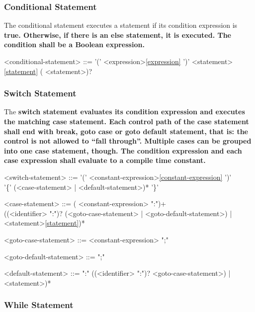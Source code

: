 \documentclass[a4paper,oneside,11pt]{article}
\begin{document}
\subsubsection{Conditional Statement}

The conditional statement executes a statement if its condition expression is \bf{true}.
Otherwise, if there is an else statement, it is executed.
The condition shall be a Boolean expression.

\begin{grammar}
\label{conditional-statement}<conditional-statement> ::=  '(' <expression>\ref{expression} ')' <statement>\ref{statement} ( <statement>)?
\end{grammar}

\subsubsection{Switch Statement}

The \bf{switch} statement evaluates its condition expression
and executes the matching case statement.
Each control path of the \bf{case} statement shall
end with \bf{break}, \bf{goto case} or \bf{goto default} statement,
that is: the control is not allowed to ``fall through''.
Multiple cases can be grouped into one \bf{case} statement, though.
The condition expression and each case expression shall evaluate to a compile time constant.

\begin{grammar}
\label{switch-statement}<switch-statement> ::=  '(' <constant-expression>\ref{constant-expression} ')'\\
'\{' (<case-statement> | <default-statement>)* '\}'

<case-statement> ::= ( <constant-expression> ":")+\\
((<identifier> ":")? (<goto-case-statement> | <goto-default-statement>) | <statement>\ref{statement})*

<goto-case-statement> ::=   <constant-expression> ";"

<goto-default-statement> ::=   ";"

<default-statement> ::=  ":" ((<identifier> ":")? <goto-case-statement>) | <statement>)*

\end{grammar}

\subsubsection{While Statement}
\end{document}
